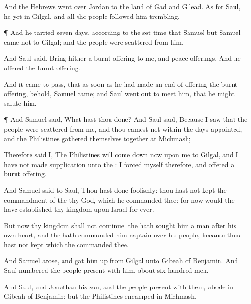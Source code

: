 {And
{} the
Hebrews went
over
Jordan to the
land of
Gad and
Gilead. As for
Saul, he
{} yet in
Gilgal, and all the
people
followed him
trembling.


\par }{\PP {}¶ And he
tarried
seven
days, according to the set
time that
Samuel
{} but
Samuel
came not to
Gilgal; and the
people were
scattered from him.

And
Saul
said, Bring
hither a burnt
offering to me, and peace
offerings. And he
offered the burnt
offering.

And it came to pass, that as soon as he had made an
end of
offering the burnt
offering, behold,
Samuel
came; and
Saul went
out to
meet him, that he might
salute him.


\par }{\PP {}¶ And
Samuel
said, What hast thou
done? And
Saul
said, Because I
saw that the
people were
scattered from me, and
{} thou
camest not within the
days
appointed, and
{} the
Philistines gathered themselves
together at
Michmash;

Therefore
said I, The
Philistines will come
down now upon me to
Gilgal, and I have not made
supplication
unto the
{}: I
forced myself therefore, and
offered a burnt
offering.

And
Samuel
said to
Saul, Thou hast done
foolishly: thou hast not
kept the
commandment of the
{} thy
God, which he
commanded thee: for now would the
{} have
established thy
kingdom upon
Israel
for
ever.

But now thy
kingdom shall not
continue: the
{} hath
sought him a
man after his own
heart, and the
{} hath
commanded him
{}
captain over his
people, because thou hast not
kept
{} which the
{}
commanded thee.


\par }{\PP {}And
Samuel
arose, and gat him
up from
Gilgal unto
Gibeah of
Benjamin. And
Saul
numbered the
people
{}
present with him, about
six
hundred
men.

And
Saul, and
Jonathan his
son, and the
people
{}
present with them,
abode in
Gibeah of
Benjamin: but the
Philistines
encamped in
Michmash.


}
